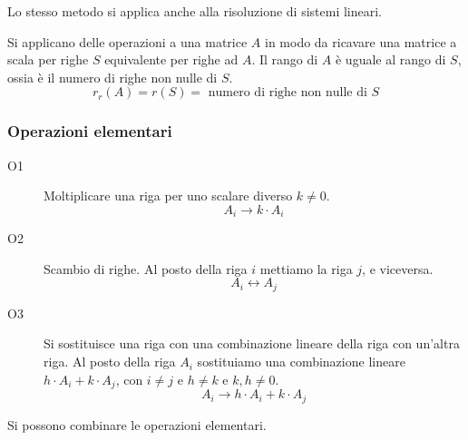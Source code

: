 Lo stesso metodo si applica anche alla risoluzione di sistemi lineari.

Si applicano delle operazioni a una matrice $A$ in modo da ricavare una matrice a scala per righe $S$ equivalente per righe ad $A$. Il rango di $A$ \`e uguale al rango di $S$, ossia \`e il numero di righe non nulle di $S$.
\[
r_r(A) = r(S) = \text{ numero di righe non nulle di } S
\]
\subsubsection{Operazioni elementari}
\begin{description}
    \item[O1\label{itm:gauss_op_1}] Moltiplicare una riga per uno scalare diverso $k \neq 0$.
    \[
    A_i \to k \cdot A_i
    \]
    \item[O2\label{itm:gauss_op_2}] Scambio di righe. Al posto della riga $i$ mettiamo la riga $j$, e viceversa.
    \[
    A_i \leftrightarrow A_j
    \]
    \item[O3\label{itm:gauss_op_3}] Si sostituisce una riga con una combinazione lineare della riga con un'altra riga. Al posto della riga $A_i$ sostituiamo una combinazione lineare $h \cdot A_i + k \cdot A_j$, con $i \neq j$ e $h \neq k$ e $k, h \neq 0$.
    \[
    A_i \to h \cdot A_i + k \cdot A_j
    \]
\end{description}
Si possono combinare le operazioni elementari.
